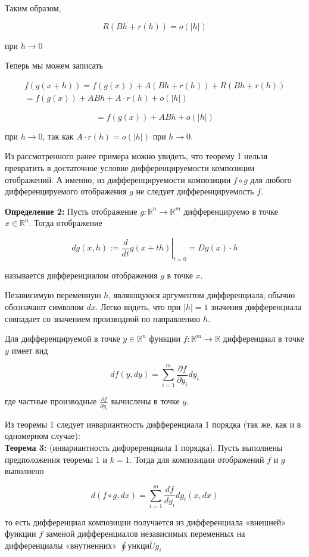 \documentclass[a4paper,12pt]{article} %
\begin{document}
Таким образом,

$$
R(B h+r(h))=o(|h|)
$$

при $h \rightarrow 0$

Теперь мы можем записать

$$
\begin{gathered}
f(g(x+h))=f(g(x))+A(B h+r(h))+R(B h+r(h)) \\
=f(g(x))+A B h+A \cdot r(h)+o(|h|)
\end{gathered}
$$

$$
=f(g(x))+A B h+o(|h|)
$$

при $h \rightarrow 0$, так как $A \cdot r(h)=o(|h|)$ при $h \rightarrow 0$.

Из рассмотренного ранее примера можно увидеть, что теорему 1 нельзя превратить в достаточное условие дифференцируемости композиции отображений. А именно, из дифференцируемости композиции $f \circ g$ для любого дифференцируемого отображения $g$ не следует дифференцируемость $f$.

\textbf{Определение 2:} Пусть отображение $g: \mathbb{R}^{n} \rightarrow \mathbb{R}^{m}$ дифференцируемо в точке $x \in \mathbb{R}^{n}$. Тогда отображение

$$
d g(x, h):=\left.\frac{d}{d t} g(x+t h)\right|_{t=0}=D g(x) \cdot h
$$

называется дифференциалом отображения $g$ в точке $x$.

Независимую переменную $h$, являющуюся аргументом дифференциала, обычно обозначают символом $d x$. Легко видеть, что при $|h|=1$ значения дифференциала совпадает со значением производной по направлению $h$.

Для дифференцируемой в точке $y \in \mathbb{R}^{n}$ функции $f: \mathbb{R}^{m} \rightarrow \mathbb{R}$ дифференциал в точке $y$ имеет вид

$$
d f(y, d y)=\sum_{i=1}^{m} \frac{\partial f}{\partial y_{i}} d y_{i}
$$

где частные производные $\frac{\partial f}{\partial y_{i}}$ вычислены в точке $y$.

Из теоремы 1 следует инвариантность дифференциала 1 порядка (так же, как и в одномерном случае):\\
\textbf{Теорема 3:} (инвариантность дифореренциала 1 порядка). Пусть выполнены предположения теоремы 1 и $k=1$. Тогда для композиции отображений $f$ и $g$ выполнено

$$
d(f \circ g, d x)=\sum_{i=1}^{m} \frac{d f}{d y_{i}} d g_{i}(x, d x)
$$

то есть дифференциал композиции получается из дифференциала «внешней» функции $f$ заменой дифференциалов независимых переменных на дифференциалы «внутненних» $\oint у н к ц и \breve{U} g_{i}$
\end{document}
